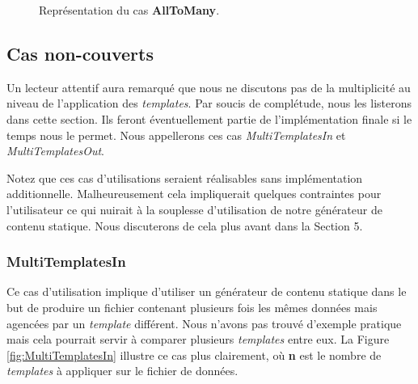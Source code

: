 			\begin{figure}
				\begin{center}
					\caption{Représentation du cas \textbf{AllToMany}.}
					\label{fig:AllToMany}
				\end{center}
			\end{figure}
		
		\subsection{Cas non-couverts}
			Un lecteur attentif aura remarqué que nous ne discutons pas de la multiplicité au niveau de l'application des \textit{templates}. Par soucis de complétude, nous les listerons dans cette section. Ils feront éventuellement partie de l'implémentation finale si le temps nous le permet. Nous appellerons ces cas \textit{MultiTemplatesIn} et \textit{MultiTemplatesOut}.
			
			 Notez que ces cas d'utilisations seraient réalisables sans implémentation additionnelle. Malheureusement cela impliquerait quelques contraintes pour l'utilisateur ce qui nuirait à la souplesse d'utilisation de notre générateur de contenu statique. Nous discuterons de cela plus avant dans la Section 5.
			
			\subsubsection*{MultiTemplatesIn}
				Ce cas d'utilisation implique  d'utiliser un générateur de contenu statique dans le but de produire un fichier contenant plusieurs fois les mêmes données mais agencées par un \textit{template} différent. Nous n'avons pas trouvé d'exemple pratique mais cela pourrait servir à comparer plusieurs \textit{templates} entre eux. La Figure \ref{fig:MultiTemplatesIn} illustre ce cas plus clairement, où \textbf{n} est le nombre de \textit{templates} à appliquer sur le fichier de données.
				
